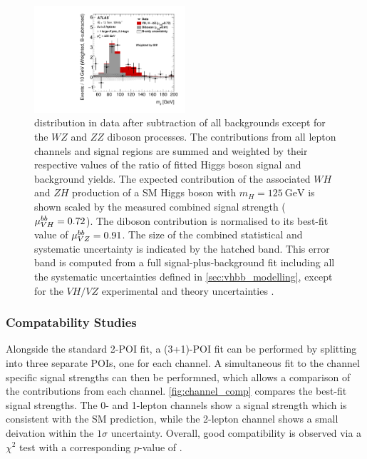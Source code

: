 \begin{figure}[!htbp]
  \centering
  \includegraphics[width=0.5\textwidth]{chapters/6.vhbb_boosted/figs/Region_BMin250_incFat1_Fat1_incJet1_Y6051_DSRnoaddbjetsr_T2_L3_distmBB_Higgsweighted_BkgSub_GlobalFit_unconditionnal_mu1.pdf}
  \caption{
    \mJ distribution in data after subtraction of all backgrounds except for the $WZ$ and $ZZ$ diboson processes. 
    The contributions from all lepton channels and signal regions are summed and weighted by their
    respective values of the ratio of fitted Higgs boson signal and
    background yields. The expected contribution of the associated $WH$
    and $ZH$ production of a SM Higgs boson with $m_H = \SI{125}{\GeV}$ is
    shown scaled by the measured combined signal strength
    ($\mu_{VH}^{bb}=0.72$). The diboson contribution is normalised to its
    best-fit value of $\mu_{VZ}^{bb}=0.91$. The size of the combined
    statistical and systematic uncertainty is indicated by the hatched
    band. This error band is computed from a full signal-plus-background
    fit including all the systematic uncertainties defined in
    \cref{sec:vhbb_modelling}, except for the $VH/VZ$
    experimental and theory uncertainties  \cite{HIGG-2018-52}.  
  }
  \label{fig:money_plot}
\end{figure}

\subsubsection{Compatability Studies}

Alongside the standard 2-POI fit, a (3+1)-POI fit can be performed by splitting \muVH into three separate POIs, one for each channel.
A simultaneous fit to the channel specific signal strengths can then be performned, which allows a comparison of the contributions from each channel.
\cref{fig:channel_comp} compares the best-fit signal strengths.
The 0- and 1-lepton channels show a signal strength which is consistent with the SM prediction, while the 2-lepton channel shows a small deivation within the $1\sigma$ uncertainty.
Overall, good compatibility is observed via a $\chi^2$ test with a corresponding $p$-value of .

